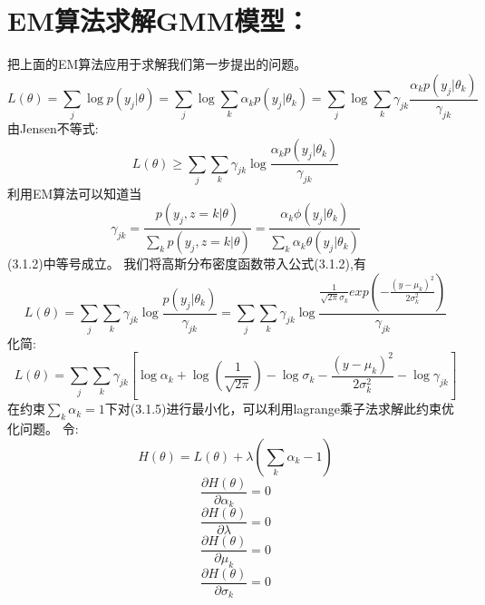 \documentclass{article}
\begin{document}
\section{EM算法求解GMM模型：}
把上面的EM算法应用于求解我们第一步提出的问题。\\
\begin{equation}
L(\theta)=\sum_j \log p(y_j| \theta)=\sum_j \log \sum_k \alpha_k p(y_j|\theta_k)=\sum_j \log \sum_k \gamma_{jk} \frac{\alpha_k p(y_j|\theta_k)}{\gamma_{jk}} \tag{3.1.1}
\end{equation}
由Jensen不等式:
\begin{equation}
L(\theta) \ge \sum_j \sum_k \gamma_{jk} \log \frac{\alpha_k p(y_j|\theta_k)}{\gamma_{jk}} \tag{3.1.2}
\end{equation}
利用EM算法可以知道当
\begin{equation}
\gamma_{jk}=\frac{p(y_j,z=k|\theta)}{\sum_{k}p(y_j,z=k|\theta)}=\frac{\alpha_k \phi(y_j|\theta_k)}{\sum_k \alpha_k \theta(y_j|\theta_k)}  \tag{3.1.3}
\end{equation}
(3.1.2)中等号成立。
我们将高斯分布密度函数带入公式(3.1.2),有
\begin{equation}
L(\theta)=\sum_j \sum_k \gamma_{jk} \log \frac{p(y_j|\theta_k)}{\gamma_{jk}}=\sum_j \sum_k \gamma_{jk} \log \frac{\frac{1}{\sqrt{2\pi}\sigma_k}exp(-\frac{(y-\mu_k)^2}{2\sigma_k^2})}{\gamma_{jk}}  \tag {3.1.4}
\end{equation}
化简:
\begin{equation}
L(\theta)=\sum_j \sum_k \gamma_{jk}[\log \alpha_k+\log(\frac{1}{\sqrt{2\pi}})-\log \sigma_k-\frac{(y-\mu_k)^2}{2\sigma_k^2}-\log \gamma_{jk}] \tag {3.1.5}
\end{equation}
在约束$\sum_k \alpha_k=1$下对(3.1.5)进行最小化，可以利用lagrange乘子法求解此约束优化问题。
令:
\begin{equation}
H(\theta)=L(\theta)+\lambda(\sum_k\alpha_k-1)　  \tag{3.1.6}
\end{equation}
\begin{equation}
\frac{\partial{H(\theta)}}{\partial{\alpha_k}}=0 \tag{3.1.7}
\end{equation}
\begin{equation}
\frac{\partial{H(\theta)}}{\partial{\lambda}}=0 \tag{3.1.8}
\end{equation}
\begin{equation}
\frac{\partial{H(\theta)}}{\partial{\mu_k}}=0 \tag{3.1.9}
\end{equation}
\begin{equation}
\frac{\partial{H(\theta)}}{\partial{\sigma_k}}=0 \tag{3.1.10}
\end{equation}
\end{document}
